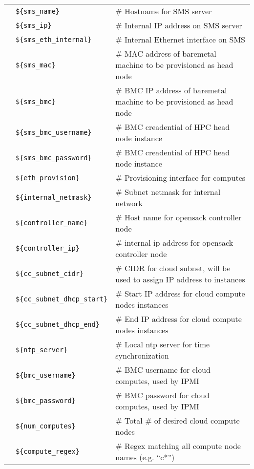 \vspace*{0.2cm}
\begin{tabular}{@{}>{\textbullet}l p{5.5cm} l}
& \texttt{\$\{sms\_name\}} & {\small \# Hostname for SMS server} \\
& \texttt{\$\{sms\_ip\}} & {\small \# Internal IP address on SMS server}  \\
& \texttt{\$\{sms\_eth\_internal\}} & {\small \# Internal Ethernet interface on SMS} \\
& \texttt{\$\{sms\_mac\}} & {\small \# MAC address of baremetal machine to be provisioned as head node} \\
& \texttt{\$\{sms\_bmc\}} & {\small \# BMC IP address of baremetal machine to be provisioned as head node} \\
& \texttt{\$\{sms\_bmc\_username\}} & {\small \# BMC creadential of HPC head node instance} \\
& \texttt{\$\{sms\_bmc\_password\}} & {\small \# BMC creadential of HPC head node instance} \\
& \texttt{\$\{eth\_provision\}} & {\small \# Provisioning interface for computes} \\
& \texttt{\$\{internal\_netmask\}} & {\small \# Subnet netmask for internal network} \\
& \texttt{\$\{controller\_name\}} & {\small \# Host name for opensack controller node} \\
& \texttt{\$\{controller\_ip\}} & {\small \# internal ip address for opensack controller node} \\
& \texttt{\$\{cc\_subnet\_cidr\}} & {\small \# CIDR for cloud subnet, will be used to assign IP address to instances } \\
& \texttt{\$\{cc\_subnet\_dhcp\_start\}} & {\small \# Start IP address for cloud compute nodes instances} \\
& \texttt{\$\{cc\_subnet\_dhcp\_end\}} & {\small \# End IP address for cloud compute nodes instances} \\
& \texttt{\$\{ntp\_server\}} & {\small \# Local ntp server for time synchronization} \\
& \texttt{\$\{bmc\_username\}} & {\small \# BMC username for cloud computes, used by IPMI} \\
& \texttt{\$\{bmc\_password\}} & {\small \# BMC password for cloud computes, used by IPMI} \\
& \texttt{\$\{num\_computes\}} & {\small \# Total \# of desired cloud compute nodes} \\
& \texttt{\$\{compute\_regex\}} & {\small \# Regex matching all compute node names (e.g. ``c*'')} \\

\end{tabular}
